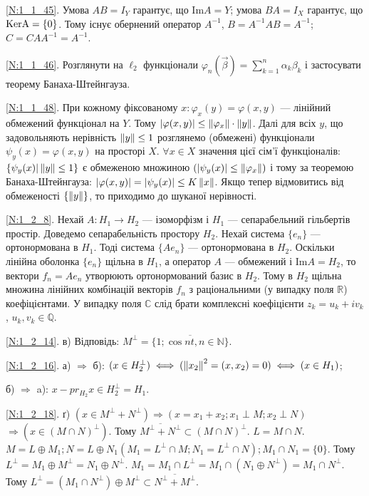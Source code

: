 \noindent\ref{N:1_1_45}. Умова $AB = I_Y$ гарантує, що $\mathrm{Im} A = Y$; умова $BA = I_X$
гарантує, що $\rm KerA = \{0\}$. Тому існує обернений оператор $A^{-1}$, $B = A^{-1}AB = A^{-1}$; $C = CAA^{-1} = A^{-1}$.

\noindent\ref{N:1_1_46}. Розглянути на $\ell_2$ функціонали $\varphi_n (\vec{\beta}) = \sum\limits_{k = 1}^{n} \alpha_k \beta_k$
і застосувати теорему Банаха-Штейнгауза.

\noindent\ref{N:1_1_48}. При кожному фіксованому $x: \varphi_x(y) = \varphi(x, y)$ --- лінійний обмежений функціонал на $Y$. Тому
$|\varphi(x, y)| \leq \left\lVert\varphi_x\right\rVert \cdot \left\lVert y\right\rVert$. Далі для всіх $y$, що задовольняють нерівність $\left\lVert y\right\rVert \leq 1$
розглянемо (обмежені) функціонали $\psi_y (x) = \varphi(x, y)$ на просторі $X$. $\forall x \in X$ значення цієї
сім'ї функціоналів: $\{\psi_y (x) | \left\lVert y\right\rVert \leq 1\}$ є обмеженою множиною $(|\psi_y(x)| \leq \left\lVert\varphi_x\right\rVert)$ і тому за теоремою
Банаха-Штейнгауза: $|\varphi(x, y)| = |\psi_y(x)| \leq K\left\lVert x\right\rVert$. Якщо тепер відмовитись від обмеженості $\{\left\lVert y\right\rVert\}$, то приходимо до
шуканої нерівності.

\noindent\ref{N:1_2_8}. Нехай $A: H_1 \to H_2$ --- ізоморфізм і $H_1$ --- сепарабельний
гільбертів простір. Доведемо сепарабельність простору $H_2$. Нехай система $\{e_n\}$ ---
ортонормована в $H_1$. Тоді система $\{A e_n\}$ --- ортонормована в $H_2$. Оскільки
лінійна оболонка $\{e_n\}$ щільна в $H_1$, а оператор $A$ --- обмежений і $\mathrm{Im}A = H_2$,
то вектори $f_n = A e_n$ утворюють ортонормований базис в $H_2$. Тому в $H_2$ щільна
множина лінійних комбінацій векторів $f_n$ з раціональними (у випадку поля $\mathbb{R}$)
коефіцієнтами. У випадку поля $\mathbb{C}$ слід брати комплексні коефіцієнти
$z_k = u_k + i v_k$, $u_k, v_k \in \mathbb{Q}$.

\noindent\ref{N:1_2_14}. в) Відповідь: $M^{\perp} = \overline{\{1; \cos nt, n \in \mathbb{N} \}}$.

\noindent\ref{N:1_2_16}. а) $\Rightarrow$ б): 
$(x \in H_2^{\perp}) \iff (\left\lVert x_2\right\rVert^2 = (x, x_2) = 0) \iff (x \in H_1)$;

\noindent б) $\Rightarrow$ a): $x - pr_{H_2} x \in H_2^{\perp} = H_1$.

\noindent\ref{N:1_2_18}. ґ) $(x \in M^{\perp}+N^{\perp}) \Rightarrow (x = x_1+x_2; x_1 \perp M; x_2 \perp N)$
$\Rightarrow (x \in (M \cap N)^{\perp})$. Тому $\overline{M^{\perp} + N^{\perp}} \subset (M \cap N)^{\perp}$.
$L = M \cap N$. $M = L \oplus  M_1; N = L \oplus N_1 (M_1 = L^{\perp} \cap M; N_1 = L^{\perp} \cap N); M_1 \cap N_1 = \{0\}$.
Тому $L^{\perp} = M_1 \oplus M^{\perp} = N_1 \oplus N^{\perp}$. 
$M_1 = M_1 \cap L^{\perp} = M_1 \cap (N_1 \oplus N^{\perp}) = M_1 \cap N^{\perp}$. 
Тому $L^{\perp} = (M_1 \cap N^{\perp}) \oplus M^{\perp} \subset \overline{N^{\perp} + M^{\perp}}$.

